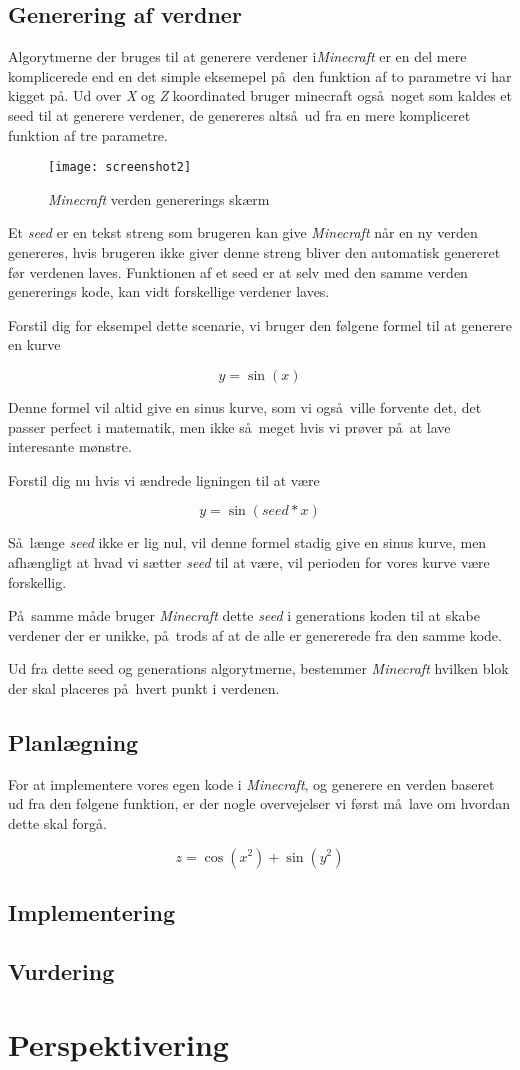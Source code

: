 \documentclass[a4paper,12pt]{report}
\begin{document}
	\subsection{Generering af verdner}
		Algorytmerne der bruges til at generere verdener i\emph{Minecraft} er en del mere komplicerede end en det simple eksemepel p\aa \ den funktion
		af to parametre vi har kigget p\aa . Ud over \emph{X} og \emph{Z} koordinated bruger minecraft ogs\aa \ noget som kaldes et seed til at generere
		verdener, de genereres alts\aa \ ud fra en mere kompliceret funktion af tre parametre.
		
		\begin{wrapfigure}{r}{0.5\textwidth}
			\texttt{[image: screenshot2]}
			\caption{\emph{Minecraft} verden genererings sk\ae rm}
		\end{wrapfigure}

		Et \emph{seed} er en tekst streng som brugeren kan give \emph{Minecraft} n\aa r en ny verden genereres, hvis brugeren ikke giver denne streng
		bliver den automatisk genereret f\o r verdenen laves. Funktionen af et seed er at selv med den samme verden genererings kode,
		kan vidt forskellige verdener laves.

		Forstil dig for eksempel dette scenarie, vi bruger den f\o lgene formel til at generere en kurve

		\[y = \sin (x)\]

		Denne formel vil altid give en sinus kurve, som vi ogs\aa \ ville forvente det, det passer perfect i matematik, men ikke s\aa \ meget
		hvis vi pr\o ver p\aa \ at lave interesante m\o nstre.

		Forstil dig nu hvis vi \ae ndrede ligningen til at være

		\[y = \sin (seed * x)\]

		S\aa \ l\ae nge \emph{seed} ikke er lig nul, vil denne formel stadig give en sinus kurve, men afh\ae ngligt at hvad vi s\ae tter \emph{seed}
		til at v\ae re, vil perioden for vores kurve v\ae re forskellig.

		P\aa \ samme m\aa de bruger \emph{Minecraft} dette \emph{seed} i generations koden til at skabe verdener der er unikke, p\aa \ trods
		af at de alle er genererede fra den samme kode.

		Ud fra dette seed og generations algorytmerne, bestemmer \emph{Minecraft} hvilken blok der skal placeres p\aa \ hvert punkt
		i verdenen.
	\subsection{Planlægning}
		For at implementere vores egen kode i \emph{Minecraft}, og generere en verden baseret ud fra den f\o lgene funktion, er der
		nogle overvejelser vi f\o rst m\aa \ lave om hvordan dette skal forg\aa .

		\[z = \cos (x^2) + \sin (y^2)\]
	\subsection{Implementering}
	\subsection{Vurdering}
	\section{Perspektivering}
\end{document}

